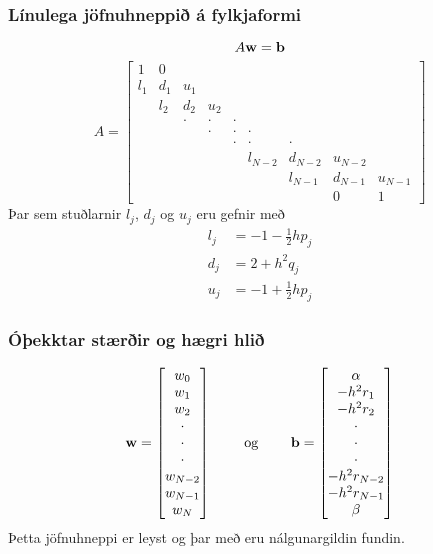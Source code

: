 \documentclass[icelandic,a4paper,12pt]{article}
\begin{document}
\subsubsection{Línulega jöfnuhneppið á fylkjaformi} 
$$
  A\mbox{${\bf w}$}=\mbox{${\bf b}$}
$$
$$
  A=\left[\begin{matrix}
  1&0\\
  l_1&d_1&u_1\\
  &l_2&d_2&u_2\\
  &&\cdot&\cdot&\cdot \\
  &&&\cdot&\cdot&\cdot \\
  &&&&\cdot&\cdot&\cdot \\
  &&&&&l_{N-2}&d_{N-2}&u_{N-2} \\
  &&&&&&l_{N-1}&d_{N-1}&u_{N-1} \\
  &&&&&&&0&1
  \end{matrix}\right]
$$
Þar sem stuðlarnir $l_j$, $d_j$ og $u_j$ eru gefnir með 
\begin{align*}
  l_j&=-1-\tfrac 12 hp_j\\
d_j&=2+h^2q_j\\
u_j&=-1+\tfrac 12 hp_j
\end{align*}



\subsubsection{Óþekktar stærðir og hægri hlið} 
$$
  \mbox{${\bf w}$}=\left[
  \begin{matrix}
w_0\\ w_1\\ w_2\\ \cdot\\ \cdot\\ \cdot\\ 
w_{N-2}\\ w_{N-1}\\ w_N  
\end{matrix}\right]
\qquad \text{ og } \qquad 
\mbox{${\bf b}$}=\left[
\begin{matrix}
\alpha \\ -h^2r_1\\ -h^2r_2\\ \cdot \\ \cdot\\ \cdot\\
-h^2r_{N-2}\\ -h^2r_{N-1}\\ \beta
\end{matrix}\right]
$$
Þetta jöfnuhneppi er leyst og þar með eru nálgunargildin fundin.
\end{document}
